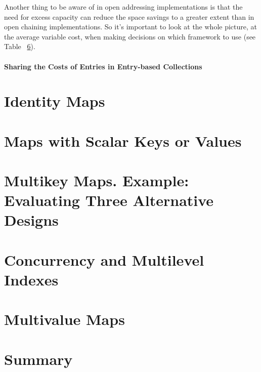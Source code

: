 Another thing to be aware of in open addressing implementations is that the
need for excess capacity can reduce the space savings to a greater
extent than in open chaining implementations. So it's important to look at the whole
picture, at the average variable cost, when making decisions on which framework
to use (see Table ~\ref{}).


\paragraph{Sharing the Costs of Entries in Entry-based Collections}

\section{Identity Maps}

\section{Maps with Scalar Keys or Values}

\section{Multikey Maps. Example: Evaluating Three Alternative Designs}

\section{Concurrency and Multilevel Indexes}

\section{Multivalue Maps}

\section{Summary}



